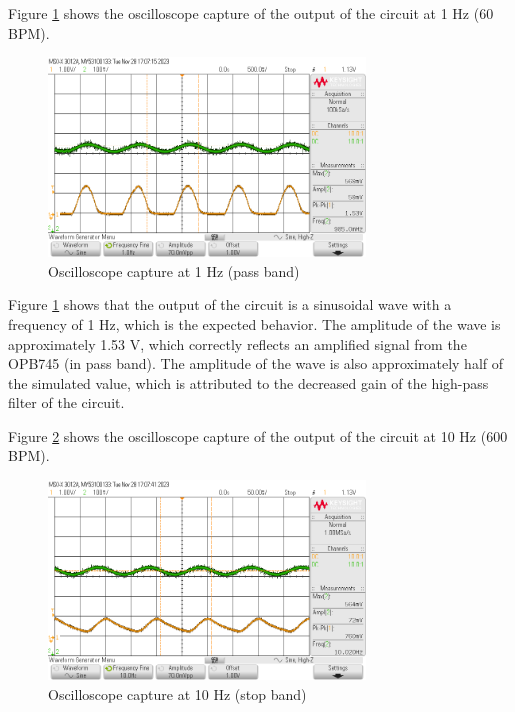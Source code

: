 \documentclass[CMPE]{KGCOEReport}
\begin{document}
Figure \ref{fig:1HzCapture} shows the oscilloscope capture of the output of the circuit at 1 Hz (60 BPM).

\begin{figure}[H]
    \centering
    \includegraphics[width=0.75\textwidth]{1Hz.png}
    \caption{Oscilloscope capture at 1 Hz (pass band)}
    \label{fig:1HzCapture}
\end{figure}

Figure \ref{fig:1HzCapture} shows that the output of the circuit is a sinusoidal wave with a frequency of 1 Hz, which is the expected behavior. The amplitude of the wave is approximately 1.53 V, which correctly reflects an amplified signal from the OPB745 (in pass band). The amplitude of the wave is also approximately half of the simulated value, which is attributed to the decreased gain of the high-pass filter of the circuit.

Figure \ref{fig:10HzCapture} shows the oscilloscope capture of the output of the circuit at 10 Hz (600 BPM).

\begin{figure}[H]
    \centering
    \includegraphics[width=0.75\textwidth]{10Hz.png}
    \caption{Oscilloscope capture at 10 Hz (stop band)}
    \label{fig:10HzCapture}
\end{figure}
\end{document}
